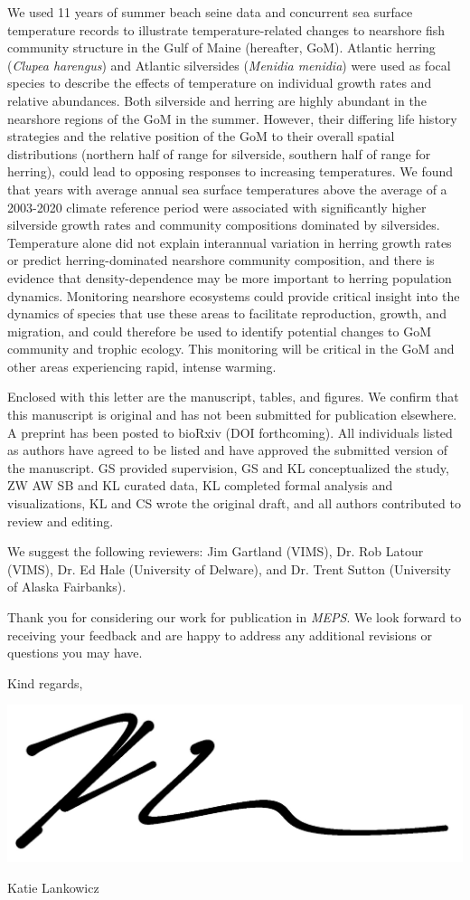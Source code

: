 \documentclass[
  11pt,
]{article}
\begin{document}
We used 11 years of summer beach seine data and concurrent sea surface temperature records to illustrate temperature-related changes to nearshore fish community structure in the Gulf of Maine (hereafter, GoM). Atlantic herring (\textit{Clupea harengus}) and Atlantic silversides (\textit{Menidia menidia}) were used as focal species to describe the effects of temperature on individual growth rates and relative abundances. Both silverside and herring are highly abundant in the nearshore regions of the GoM in the summer. However, their differing life history strategies and the relative position of the GoM to their overall spatial distributions (northern half of range for silverside, southern half of range for herring), could lead to opposing responses to increasing temperatures. We found that years with average annual sea surface temperatures above the average of a 2003-2020 climate reference period were associated with significantly higher silverside growth rates and community compositions dominated by silversides. Temperature alone did not explain interannual variation in herring growth rates or predict herring-dominated nearshore community composition, and there is evidence that density-dependence may be more important to herring population dynamics. Monitoring nearshore ecosystems could provide critical insight into the dynamics of species that use these areas to facilitate reproduction, growth, and migration, and could therefore be used to identify potential changes to GoM community and trophic ecology. This monitoring will be critical in the GoM and other areas experiencing rapid, intense warming.

Enclosed with this letter are the manuscript, tables, and figures. We confirm that this manuscript is original and has not been submitted for publication elsewhere. A preprint has been posted to bioRxiv (DOI forthcoming). All individuals listed as authors have agreed to be listed and have approved the submitted version of the manuscript. GS provided supervision, GS and KL conceptualized the study, ZW AW SB and KL curated data, KL completed formal analysis and visualizations, KL and CS wrote the original draft, and all authors contributed to review and editing.

We suggest the following reviewers: Jim Gartland (VIMS), Dr. Rob Latour (VIMS), Dr. Ed Hale (University of Delware), and Dr. Trent Sutton (University of Alaska Fairbanks).

Thank you for considering our work for publication in \textit{MEPS}. We look forward to receiving your feedback and are happy to address any additional revisions or questions you may have.

\vspace*{0.5em}

Kind regards,

\includegraphics[width=0.2\linewidth]{katie-lankowicz}

Katie Lankowicz
\end{document}
